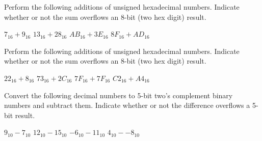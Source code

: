 \exercise %
Perform the following additions of unsigned hexadecimal numbers. Indicate whether or not the
sum overflows an 8-bit (two hex digit) result.
\begin{tasks}
	\task $7_{16} + 9_{16}$
	\task $13_{16} + 28_{16}$
	\task $AB_{16} + 3E_{16}$
	\task $8F_{16} + AD_{16}$
\end{tasks}

\exercise %
Perform the following additions of unsigned hexadecimal numbers. Indicate whether or not the
sum overflows an 8-bit (two hex digit) result.
\begin{tasks}
	\task $22_{16} + 8_{16}$
	\task $73_{16} + 2C_{16}$
	\task $7F_{16} + 7F_{16}$
	\task $C2_{16} + A4_{16}$
\end{tasks}

\exercise %
Convert the following decimal numbers to 5-bit two's complement binary numbers and subtract them.
Indicate whether or not the difference overflows a 5-bit result.
\begin{tasks}
	\task $9_{10} - 7_{10}$
	\task $12_{10} - 15_{10}$
	\task $-6_{10} - 11_{10}$
	\task $4_{10} - - 8_{10}$
\end{tasks}


